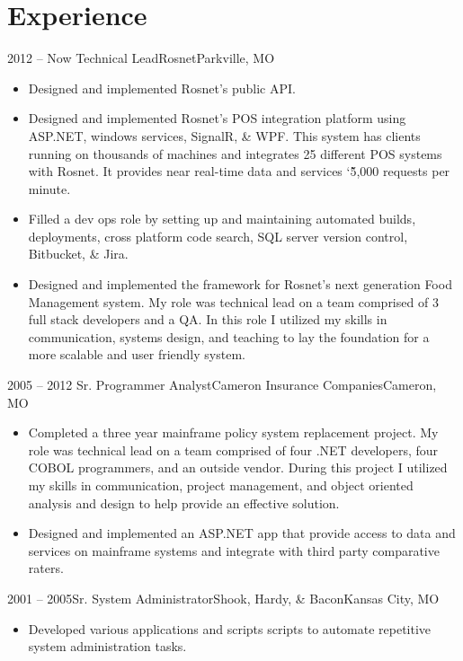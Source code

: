 \documentclass[11pt,letterpaper,final]{moderncv}
\begin{document}
\section{Experience} 
	\cventry
{2012 -- Now} {Technical Lead}{Rosnet}{Parkville, MO}{}{
		\begin{itemize}
			\item
				Designed and implemented Rosnet's public API.
			\item
				Designed and implemented Rosnet's POS integration
				platform using ASP.NET, windows services, SignalR, \&
				WPF. This system has clients running on thousands of
				machines and integrates 25 different POS systems with
				Rosnet. It provides near real-time data and services
				\char`\~5,000 requests per minute.
			\item
				Filled a dev ops role by setting up and maintaining
				automated builds, deployments, cross platform code
				search, SQL server version control, Bitbucket, & Jira.
			\item
				Designed and implemented the framework for Rosnet's next
				generation Food Management system. My role was technical lead on
				a team comprised of 3 full stack developers and a QA. In this
				role I utilized my skills in communication, systems design, and
				teaching to lay the foundation for a more scalable and user
				friendly system.
		\end{itemize}
}
	\cventry
{2005 -- 2012} {Sr. Programmer Analyst}{Cameron Insurance Companies}{Cameron, MO}{}{
		\begin{itemize}
			\item 
				Completed a three year mainframe policy system
				replacement project. My role was technical lead on a
				team comprised of four .NET developers, four COBOL
				programmers, and an outside vendor. During this project
				I utilized my skills in communication, project
				management, and object oriented analysis and design to
				help provide an effective solution.
			\item 
				Designed and implemented an ASP.NET app that provide
				access to data and services on mainframe systems and
				integrate with third party comparative raters.
		\end{itemize}
}

	\cventry
{2001 -- 2005}{Sr. System Administrator}{Shook, Hardy, \& Bacon}{Kansas City, MO}{}{
		\begin{itemize}
			\item
				Developed various applications and scripts scripts to
				automate repetitive system administration tasks.
		\end{itemize}
	}
\end{document}
